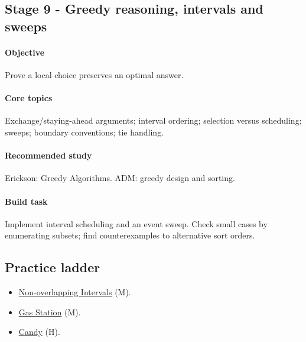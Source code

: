 \documentclass[11pt,letterpaper]{article}
\begin{document}
\par{}
\begin{samepage}
\section{Stage 9 - Greedy reasoning, intervals and sweeps}\label{sec:13}

\label{stage:9}


\paragraph*{Objective}

Prove a local choice preserves an optimal answer.

\end{samepage}

\paragraph*{Core topics}

Exchange/staying-ahead arguments; interval ordering; selection versus scheduling; sweeps; boundary conventions; tie handling.

\paragraph*{Recommended study}

Erickson: Greedy Algorithms. ADM: greedy design and sorting.

\paragraph*{Build task}

Implement interval scheduling and an event sweep. Check small cases by enumerating subsets; find counterexamples to alternative sort orders.

\subsection*{Practice ladder}

\begin{itemize}

\item \href{https://leetcode.com/problems/non-overlapping-intervals/}{Non-overlapping Intervals} (M).

\item \href{https://leetcode.com/problems/gas-station/}{Gas Station} (M).

\item \href{https://leetcode.com/problems/candy/}{Candy} (H).

\end{itemize}
\end{document}
